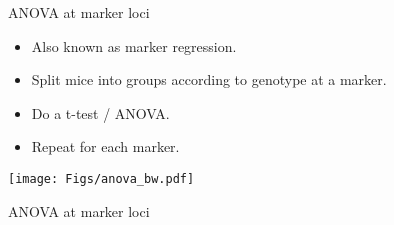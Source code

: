 \documentclass[12pt]{article}
\newcommand{\headsize}{\fontsize{35}{35} \selectfont}
\newcommand{\smallsize}{\fontsize{25}{30} \selectfont}
\newcommand{\smallersize}{\fontsize{20}{25} \selectfont}
\begin{document}
\newpage

\headsize \color{myyellow}
\hfill\begin{minipage}{5.75in}
\centering
ANOVA at marker loci
\end{minipage}

\vspace{2cm}

\color{mywhite} \smallsize

\hspace*{0.5in}
\begin{minipage}[t]{4.1in}
\vspace*{5mm}

\sloppy
\smallersize
\begin{itemize}
\setlength{\rightskip}{0pt plus 1fil} %
\item Also known as {\color{mypink} marker regression}.
\item Split mice into groups according to genotype at a marker.
\item Do a t-test / ANOVA.
\item Repeat for each marker.
\end{itemize}
\end{minipage}
\hfill
\begin{minipage}[t]{5.3in}
\vspace*{0mm}

\texttt{[image: Figs/anova\_bw.pdf]}
\end{minipage}







\newpage

\headsize \color{myyellow}
\hfill \begin{minipage}{5.75in}
\centering
ANOVA at marker loci
\end{minipage}

\vspace{2cm}

\color{mywhite} \smallsize
\end{document}
